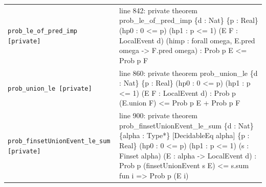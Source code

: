\documentclass[10pt]{article}
\begin{document}
\begin{longtable}{>{\raggedright\arraybackslash}p{} >{\raggedright\arraybackslash}p{}}
\texttt{prob\_\allowbreak{}le\_\allowbreak{}of\_\allowbreak{}pred\_\allowbreak{}imp [private]} & {\ttfamily\scriptsize line 842:\allowbreak{} private theorem prob\_\allowbreak{}le\_\allowbreak{}of\_\allowbreak{}pred\_\allowbreak{}imp \{d :\allowbreak{} Nat\} \{p :\allowbreak{} Real\} (\allowbreak{}hp0 :\allowbreak{} 0 <=\allowbreak{} p)\allowbreak{} (\allowbreak{}hp1 :\allowbreak{} p <=\allowbreak{} 1)\allowbreak{} (\allowbreak{}E F :\allowbreak{} LocalEvent d)\allowbreak{} (\allowbreak{}himp :\allowbreak{} forall omega,\allowbreak{} E.\allowbreak{}pred omega -\allowbreak{}> F.\allowbreak{}pred omega)\allowbreak{} :\allowbreak{} Prob p E <=\allowbreak{} Prob p F} \\[0.45em]
\texttt{prob\_\allowbreak{}union\_\allowbreak{}le [private]} & {\ttfamily\scriptsize line 860:\allowbreak{} private theorem prob\_\allowbreak{}union\_\allowbreak{}le \{d :\allowbreak{} Nat\} \{p :\allowbreak{} Real\} (\allowbreak{}hp0 :\allowbreak{} 0 <=\allowbreak{} p)\allowbreak{} (\allowbreak{}hp1 :\allowbreak{} p <=\allowbreak{} 1)\allowbreak{} (\allowbreak{}E F :\allowbreak{} LocalEvent d)\allowbreak{} :\allowbreak{} Prob p (\allowbreak{}E.\allowbreak{}union F)\allowbreak{} <=\allowbreak{} Prob p E +\allowbreak{} Prob p F} \\[0.45em]
\texttt{prob\_\allowbreak{}finsetUnionEvent\_\allowbreak{}le\_\allowbreak{}sum [private]} & {\ttfamily\scriptsize line 900:\allowbreak{} private theorem prob\_\allowbreak{}finsetUnionEvent\_\allowbreak{}le\_\allowbreak{}sum \{d :\allowbreak{} Nat\} \{alpha :\allowbreak{} Type*\allowbreak{}\} [DecidableEq alpha] \{p :\allowbreak{} Real\} (\allowbreak{}hp0 :\allowbreak{} 0 <=\allowbreak{} p)\allowbreak{} (\allowbreak{}hp1 :\allowbreak{} p <=\allowbreak{} 1)\allowbreak{} (\allowbreak{}s :\allowbreak{} Finset alpha)\allowbreak{} (\allowbreak{}E :\allowbreak{} alpha -\allowbreak{}> LocalEvent d)\allowbreak{} :\allowbreak{} Prob p (\allowbreak{}finsetUnionEvent s E)\allowbreak{} <=\allowbreak{} s.\allowbreak{}sum fun i =\allowbreak{}> Prob p (\allowbreak{}E i)\allowbreak{}} \\[0.45em]

\end{longtable}
\end{document}
